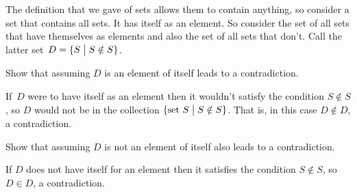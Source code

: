 \documentclass{test}  %
\begin{document}
\begin{problem} 
The definition that we gave of sets allows them to contain anything, so 
consider a set that contains all sets.
It has itself as an element.
So
consider the set of all sets that have themselves as elements and  
also the set of all sets that don't.
Call the latter set~$D=\{S \bigm| S\notin S\}$.
\begin{exes}
\begin{exercise} 
  Show that assuming $D$ is an element of itself leads to a contradiction.
\end{exercise}
\begin{answer}
  If~$D$ were to have itself as an element 
  then it wouldn't satisfy the condition
  $S\notin S$, so $D$ would not be in the collection 
  $\{\text{set~$S$} \bigm| S\notin S\}$.
  That is, in this case $D\notin D$, a contradiction.   
\end{answer}
\begin{exercise} 
  Show that assuming $D$ is not an element of itself also leads to a
  contradiction.  
\end{exercise}
\begin{answer}
  If $D$ does not have itself for an element then it satisfies the
  condition $S\notin S$, so $D\in D$, a contradiction.  
\end{answer}
\end{exes}
\end{problem}
\end{document}
